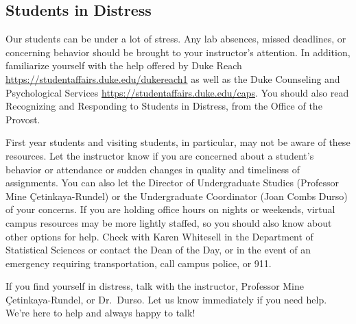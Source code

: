 \documentclass[
]{article}
\begin{document}
\hypertarget{students-in-distress}{%
\subsection{Students in Distress}\label{students-in-distress}}

Our students can be under a lot of stress. Any lab absences, missed deadlines, or concerning behavior should be brought to your instructor's attention. In addition, familiarize yourself with the help offered by Duke Reach \url{https://studentaffairs.duke.edu/dukereach1} as well as the Duke Counseling and Psychological Services \url{https://studentaffairs.duke.edu/caps}. You should also read Recognizing and Responding to Students in Distress, from the Office of the Provost.

First year students and visiting students, in particular, may not be aware of these resources. Let the instructor know if you are concerned about a student's behavior or attendance or sudden changes in quality and timeliness of assignments. You can also let the Director of Undergraduate Studies (Professor Mine Çetinkaya-Rundel) or the Undergraduate Coordinator (Joan Combs Durso) of your concerns. If you are holding office hours on nights or weekends, virtual campus resources may be more lightly staffed, so you should also know about other options for help. Check with Karen Whitesell in the Department of Statistical Sciences or contact the Dean of the Day, or in the event of an emergency requiring transportation, call campus police, or 911.

If you find yourself in distress, talk with the instructor, Professor Mine Çetinkaya-Rundel, or Dr.~Durso. Let us know immediately if you need help. We're here to help and always happy to talk!

  
\end{document}

